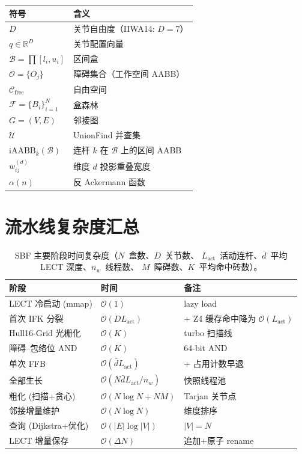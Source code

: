 \documentclass[journal]{IEEEtran}
\newcommand{\iAABB}{\mathrm{iAABB}}
\newcommand{\Real}{\mathbb{R}}
\newcommand{\Cfree}{\mathcal{C}_{\mathrm{free}}}
\newcommand{\calO}{\mathcal{O}}
\newcommand{\calF}{\mathcal{F}}
\begin{document}
\begin{table}[ht]
\centering
\small
\begin{tabular}{@{}ll@{}}
\toprule
\textbf{符号} & \textbf{含义} \\
\midrule
$D$ & 关节自由度（IIWA14: $D=7$） \\
$q \in \Real^D$ & 关节配置向量 \\
$\mathcal{B} = \prod [l_i, u_i]$ & 区间盒 \\
$\calO = \{O_j\}$ & 障碍集合（工作空间 AABB） \\
$\Cfree$ & 自由空间 \\
$\calF = \{B_i\}_{i=1}^N$ & 盒森林 \\
$G = (V, E)$ & 邻接图 \\
$\mathcal{U}$ & UnionFind 并查集 \\
$\iAABB_k(\mathcal{B})$ & 连杆 $k$ 在 $\mathcal{B}$ 上的区间 AABB \\
$w_{ij}^{(d)}$ & 维度 $d$ 投影重叠宽度 \\
$\alpha(n)$ & 反 Ackermann 函数 \\
\bottomrule
\end{tabular}
\end{table}

\section{流水线复杂度汇总}\label{app:complexity}

\begin{table}[ht]
\centering
\small
\caption{SBF 主要阶段时间复杂度（$N$~盒数、$D$~关节数、
$L_\text{act}$~活动连杆、$\bar d$~平均 LECT 深度、$n_w$~线程数、
$M$~障碍数、$K$~平均命中砖数）。}
\label{tab:total_complexity}
\begin{tabular}{@{}lll@{}}
\toprule
\textbf{阶段} & \textbf{时间} & \textbf{备注} \\
\midrule
LECT 冷启动 (mmap)        & $\mathcal{O}(1)$           & lazy load \\
首次 IFK 分裂           & $\mathcal{O}(D L_\text{act})$ & + Z4 缓存命中降为 $\mathcal{O}(L_\text{act})$ \\
Hull16-Grid 光栅化       & $\mathcal{O}(K)$           & turbo 扫描线 \\
障碍--包络位 AND          & $\mathcal{O}(K)$           & 64-bit AND \\
单次 FFB                  & $\mathcal{O}(\bar d L_\text{act})$ & + 占用计数早退 \\
全部生长                  & $\mathcal{O}(N\bar d L_\text{act}/n_w)$ & 快照线程池 \\
粗化 (扫描+贪心)          & $\mathcal{O}(N\log N + N M)$ & Tarjan 关节点 \\
邻接增量维护              & $\mathcal{O}(N\log N)$ & 维度排序 \\
查询 (Dijkstra+优化)      & $\mathcal{O}(|E|\log|V|)$ & $|V|=N$ \\
LECT 增量保存             & $\mathcal{O}(\Delta N)$ & 追加+原子 rename \\
\bottomrule
\end{tabular}
\end{table}
\end{document}
